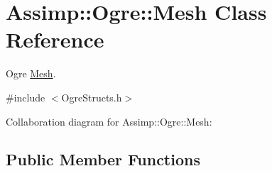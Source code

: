 \hypertarget{class_assimp_1_1_ogre_1_1_mesh}{\section{Assimp\+:\+:Ogre\+:\+:Mesh Class Reference}
\label{class_assimp_1_1_ogre_1_1_mesh}
}


Ogre \hyperlink{class_assimp_1_1_ogre_1_1_mesh}{Mesh}.  




{\ttfamily \#include $<$Ogre\+Structs.\+h$>$}



Collaboration diagram for Assimp\+:\+:Ogre\+:\+:Mesh\+:
\subsection*{Public Member Functions}
